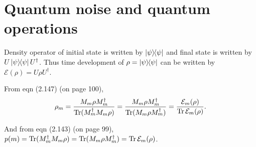 
\chapter{Quantum noise and quantum operations}
Density operator of initial state is written by $\ket{\psi}\hspace{-1mm} \bra{\psi}$ and final state is written by $U\ket{\psi}\hspace{-1mm} \bra{\psi}U^\dagger$.
Thus time development of $\rho = \ket{\psi}\hspace{-1mm} \bra{\psi}$ can be written by $\mathcal{E}(\rho) = U\rho U^\dagger$.

From eqn (2.147) (on page 100),
\begin{align*}
	\rho_m = \frac{M_m \rho M_m^\dagger}{\operatorname{Tr} (M_m^\dagger  M_m\rho ) }
					= \frac{M_m \rho M_m^\dagger}{\operatorname{Tr} ( M_m \rho M_m^\dagger ) }
					= \frac{\mathcal{E}_m (\rho)}{\operatorname{Tr} \mathcal{E}_m (\rho)}.
\end{align*}

And from eqn (2.143) (on page 99), $p(m) = \operatorname{Tr} (M_m^\dagger M_m \rho) = \operatorname{Tr} (M_m \rho M_m^\dagger) = \operatorname{Tr} \mathcal{E}_m (\rho)$.





